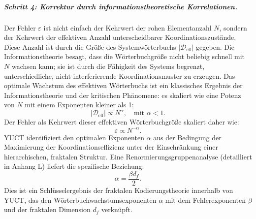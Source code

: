 \documentclass[12pt,a4paper]{article}
\theoremstyle{remark}
\begin{document}
	\subparagraph*{Schritt 4: Korrektur durch informationstheoretische Korrelationen.}
	Der Fehler \(\varepsilon\) ist nicht einfach der Kehrwert der rohen Elementanzahl \(N\), sondern der Kehrwert der effektiven Anzahl unterscheidbarer Koordinationszustände. Diese Anzahl ist durch die Größe des Systemwörterbuchs \(|\mathcal{D}_{\text{eff}}|\) gegeben. Die Informationstheorie besagt, dass die Wörterbuchgröße nicht beliebig schnell mit \(N\) wachsen kann; sie ist durch die Fähigkeit des Systems begrenzt, unterschiedliche, nicht interferierende Koordinationsmuster zu erzeugen. Das optimale Wachstum des effektiven Wörterbuchs ist ein klassisches Ergebnis der Informationstheorie und der kritischen Phänomene: es skaliert wie eine Potenz von \(N\) mit einem Exponenten kleiner als 1:
	\begin{equation}
		|\mathcal{D}_{\text{eff}}| \propto N^{\alpha}, \quad \text{mit } \alpha < 1.
		\label{eq:dict_scale}
	\end{equation}
	Der Fehler als Kehrwert dieser effektiven Wörterbuchgröße skaliert daher wie:
	\begin{equation}
		\varepsilon \propto N^{-\alpha}.
		\label{eq:error_scale_corrected}
	\end{equation}
	YUCT identifiziert den optimalen Exponenten \(\alpha\) aus der Bedingung der Maximierung der Koordinationseffizienz unter der Einschränkung einer hierarchischen, fraktalen Struktur. Eine Renormierungsgruppenanalyse (detailliert in Anhang L) liefert die spezifische Beziehung:
	\begin{equation}
		\alpha = \frac{\beta d_f}{2}.
		\label{eq:alpha_from_beta}
	\end{equation}
	Dies ist ein Schlüsselergebnis der fraktalen Kodierungstheorie innerhalb von YUCT, das den Wörterbuchwachstumsexponenten \(\alpha\) mit dem Fehlerexponenten \(\beta\) und der fraktalen Dimension \(d_f\) verknüpft.
	
\end{document}
